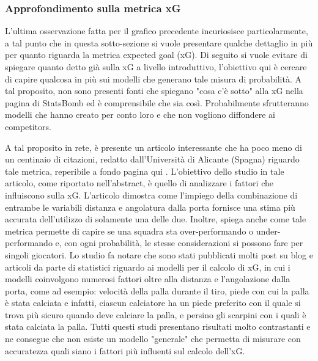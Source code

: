             \vspace{5pt}

            \subsubsection{Approfondimento sulla metrica xG}
                L'ultima osservazione fatta per il grafico precedente incuriosisce particolarmente, a tal punto che in questa sotto-sezione si vuole presentare qualche dettaglio in più per quanto riguarda la metrica expected goal (xG). Di seguito si vuole evitare di spiegare quanto detto già sulla xG a livello introduttivo, l'obiettivo qui è cercare di capire qualcosa in più sui modelli che generano tale misura di probabilità. A tal proposito, non sono presenti fonti che spiegano "cosa c'è sotto" alla xG nella pagina di StatsBomb \cite{StatsBomb} ed è comprensibile che sia così. Probabilmente sfrutteranno modelli che hanno creato per conto loro e che non vogliono diffondere ai competitors. 

                A tal proposito in rete, è presente un articolo interessante che ha poco meno di un centinaio di citazioni, redatto dall'Università di Alicante (Spagna) riguardo tale metrica, reperibile a fondo pagina qui \cite{Articolo}. L'obiettivo dello studio in tale articolo, come riportato nell'abstract, è quello di analizzare i fattori che influiscono sulla xG. L'articolo dimostra come l'impiego della combinazione di entrambe le variabili distanza e angolatura dalla porta fornisce una stima più accurata dell'utilizzo di solamente una delle due. Inoltre, spiega anche come tale metrica permette di capire se una squadra sta over-performando o under-performando e, con ogni probabilità, le stesse considerazioni si possono fare per singoli giocatori. Lo studio fa notare che sono stati pubblicati molti post su blog e articoli da parte di statistici riguardo ai modelli per il calcolo di xG, in cui i modelli coinvolgono numerosi fattori oltre alla distanza e l'angolazione dalla porta, come ad esempio: velocità della palla durante il tiro, piede con cui la palla è stata calciata e infatti, ciascun calciatore ha un piede preferito con il quale si trova più sicuro quando deve calciare la palla, e persino gli scarpini con i quali è stata calciata la palla. Tutti questi studi presentano risultati molto contrastanti e ne consegue che non esiste un modello "generale" che permetta di misurare con accuratezza quali siano i fattori più influenti sul calcolo dell'xG.

